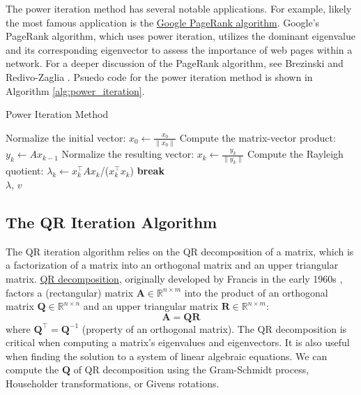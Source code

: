 \documentclass{article}[11pt]
\begin{document}
The power iteration method has several notable applications. For example, likely the most famous application is the \href{https://en.wikipedia.org/wiki/PageRank}{Google PageRank algorithm}.
Google's PageRank algorithm, which uses power iteration, utilizes the dominant eigenvalue and its corresponding eigenvector to assess the importance of web pages within a network.
For a deeper discussion of the PageRank algorithm, see Brezinski and Redivo-Zaglia \citep{Brezinski:2006}. Psuedo code for the power iteration method is shown in Algorithm \ref{alg:power_iteration}.
\begin{algorithm}[H]
   \caption{Power Iteration Method}\label{alg:power_iteration}
\begin{algorithmic}[1]
   
   \State Normalize the initial vector: $x_0 \leftarrow \frac{x_0}{\|x_0\|}$
       \State Compute the matrix-vector product: $y_k \leftarrow A x_{k-1}$
       \State Normalize the resulting vector: $x_k \leftarrow \frac{y_k}{\|y_k\|}$
       \State Compute the Rayleigh quotient: $\lambda_k \leftarrow x_k^\top A x_k$/($x_k^\top x_k$)
           \State \textbf{break}
       \EndIf
   \EndFor
   \\
   \Return $\lambda$, $v$
   \end{algorithmic}
\end{algorithm}

\subsection{The QR Iteration Algorithm}
The QR iteration algorithm relies on the QR decomposition of a matrix, which is a factorization of a matrix into an orthogonal matrix and an upper triangular matrix.
\href{https://en.wikipedia.org/wiki/QR_decomposition}{QR decomposition}, originally developed by Francis in the early 1960s \cite{Francis-QR-1961, Francis-QR-1962}, factors a (rectangular) matrix $\mathbf{A}\in\mathbb{R}^{n\times{m}}$ 
into the product of an orthogonal matrix $\mathbf{Q}\in\mathbb{R}^{n\times{n}}$ and 
an upper triangular matrix $\mathbf{R}\in\mathbb{R}^{n\times{m}}$:
\begin{equation}
\mathbf{A} = \mathbf{Q}\mathbf{R}
\end{equation}
where $\mathbf{Q}^{\top} = \mathbf{Q}^{-1}$ (property of an orthogonal matrix). 
The QR decomposition is critical when computing a matrix's eigenvalues and eigenvectors. It is also useful when finding the solution to a system of linear algebraic equations. We can compute the $\mathbf{Q}$ of QR decomposition using the Gram-Schmidt process, Householder transformations, or Givens rotations.
\end{document}
